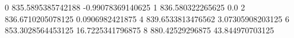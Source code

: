 0 835.5895385742188 -0.99078369140625
1 836.580322265625 0.0
2 836.6710205078125 0.0906982421875
4 839.6533813476562 3.07305908203125
6 853.3028564453125 16.7225341796875
8 880.42529296875 43.844970703125
